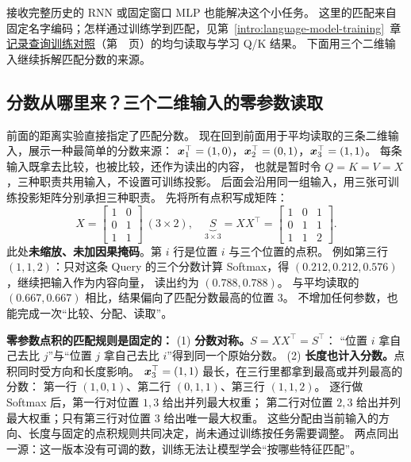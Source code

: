 接收完整历史的 RNN 或固定窗口 MLP 也能解决这个小任务。
这里的匹配来自固定名字编码；怎样通过训练学到匹配，见第~\ref*{intro:language-model-training}~章
\hyperref[experiment:attention-selection]{记录查询训练对照}（第~\pageref*{experiment:attention-selection}~页）的均匀读取与学习 Q/K 结果。
下面用三个二维输入继续拆解匹配分数的来源。

\subsection{分数从哪里来？三个二维输入的零参数读取}

前面的距离实验直接指定了匹配分数。
现在回到前面用于平均读取的三条二维输入，展示一种最简单的分数来源：
$\boldsymbol{x}_1^\top=(1,0)$，$\boldsymbol{x}_2^\top=(0,1)$，$\boldsymbol{x}_3^\top=(1,1)$。
每条输入既拿去比较，也被比较，还作为读出的内容，
也就是暂时令 $Q=K=V=X$，三种职责共用输入，不设置可训练投影。
后面会沿用同一组输入，用三张可训练投影矩阵分别承担三种职责。
先将所有点积写成矩阵：
\[
X=\begin{bmatrix}1&0\\0&1\\1&1\end{bmatrix}
\ (3\times2),\quad
\underbrace{S}_{3\times3}=XX^\top
=\boxed{\begin{bmatrix}1&0&1\\0&1&1\\1&1&2\end{bmatrix}}.
\]
此处\textbf{未缩放、未加因果掩码}。第 $i$ 行是位置 $i$ 与三个位置的点积。
例如第三行 $(1,1,2)$：只对这条 Query 的三个分数计算 Softmax，得
$(0.212,0.212,0.576)$，继续把输入作为内容向量，
读出约为 $(0.788,0.788)$。
与平均读取的 $(0.667,0.667)$ 相比，结果偏向了匹配分数最高的位置 3。
不增加任何参数，也能完成一次“比较、分配、读取”。

\begin{boundarybox}
\textbf{零参数点积的匹配规则是固定的：}
(1) \textbf{分数对称。}$S=XX^\top=S^\top$：
“位置 $i$ 拿自己去比 $j$”与“位置 $j$ 拿自己去比 $i$”得到同一个原始分数。
(2) \textbf{长度也计入分数。}点积同时受方向和长度影响。
$\boldsymbol{x}_3^\top=(1,1)$ 最长，在三行里都拿到最高或并列最高的分数：
第一行 $(1,0,1)$、第二行 $(0,1,1)$、第三行 $(1,1,2)$。
逐行做 Softmax 后，第一行对位置 $1,3$ 给出并列最大权重；
第二行对位置 $2,3$ 给出并列最大权重；只有第三行对位置 $3$ 给出唯一最大权重。
这些分配由当前输入的方向、长度与固定的点积规则共同决定，尚未通过训练按任务需要调整。
两点同出一源：这一版本没有可调的数，训练无法让模型学会“按哪些特征匹配”。
\end{boundarybox}

